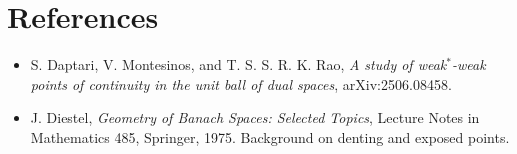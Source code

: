 \documentclass[11pt]{article}
\begin{document}
\section*{References}

\begin{itemize}
\item S. Daptari, V. Montesinos, and T. S. S. R. K. Rao,
\emph{A study of weak$^*$-weak points of continuity in the unit ball of dual spaces},
arXiv:2506.08458.
\item J. Diestel, \emph{Geometry of Banach Spaces: Selected Topics}, Lecture Notes in
Mathematics 485, Springer, 1975. Background on denting and exposed points.
\end{itemize}
\end{document}
